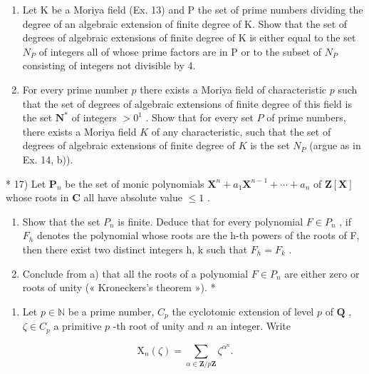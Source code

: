 \begin{enumerate}
\def\labelenumi{\arabic{enumi})}
\setcounter{enumi}{14}
\item
  Let K be a Moriya field (Ex. 13) and P the set of prime numbers dividing the degree of an algebraic extension of finite degree of K. Show that the set of degrees of algebraic extensions of finite degree of K is either equal to the set \(N_{P}\) of integers all of whose prime factors are in P or to the subset of \(N_{P}\) consisting of integers not divisible by 4.
\item
  For every prime number \(p\) there exists a Moriya field of characteristic \(p\) such that the set of degrees of algebraic extensions of finite degree of this field is the set \(\mathbf{N}^*\) of integers \(>0^1\) . Show that for every set \(P\) of prime numbers, there exists a Moriya field \(K\) of any characteristic, such that the set of degrees of algebraic extensions of finite degree of \(K\) is the set \(N_P\) (argue as in Ex. 14, b)).
\end{enumerate}

* 17) Let \(\mathbf{P}_n\) be the set of monic polynomials \(\mathbf{X}^n + a_1\mathbf{X}^{n-1} + \cdots + a_n\) of \(\mathbf{Z}[\mathbf{X}]\) whose roots in \(\mathbf{C}\) all have absolute value \(\leqslant 1\) .

\begin{enumerate}
\def\labelenumi{\alph{enumi})}
\item
  Show that the set \(P_{n}\) is finite. Deduce that for every polynomial \(F \in P_{n}\) , if \(F_{h}\) denotes the polynomial whose roots are the h-th powers of the roots of F, then there exist two distinct integers h, k such that \(F_{h} = F_{k}\) .
\item
  Conclude from a) that all the roots of a polynomial \(F \in P_{n}\) are either zero or roots of unity (« Kroneckers's theorem »). *
\end{enumerate}

\begin{enumerate}
\def\labelenumi{\arabic{enumi})}
\setcounter{enumi}{17}
\tightlist
\item
  Let \(p \in \mathbb{N}\) be a prime number, \(C_p\) the cyclotomic extension of level \(p\) of \(\mathbf{Q}\) , \(\zeta \in C_p\) a primitive \(p\) -th root of unity and \(n\) an integer. Write
\end{enumerate}

\[
\mathrm{X} _ {n} (\zeta) = \sum_ {\alpha \in \mathbf {Z} / p \mathbf {Z}} \zeta^ {\alpha^ {n}}.
\]

